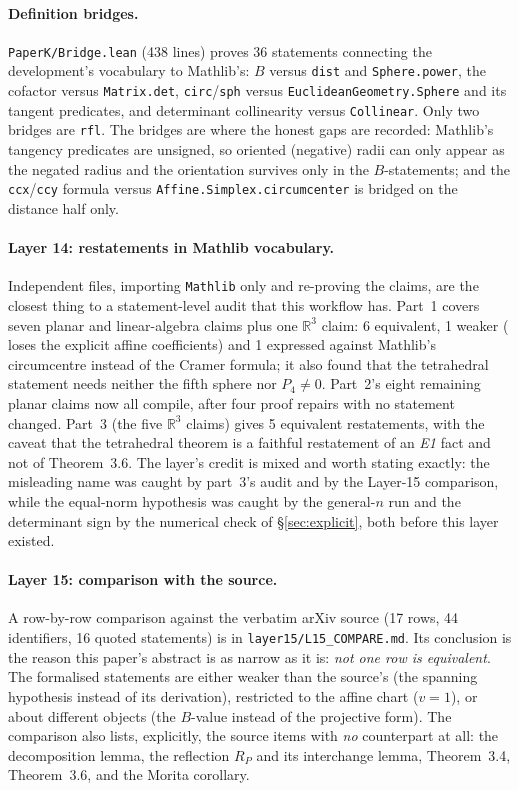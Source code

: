 \documentclass[11pt]{article}
\theoremstyle{definition}
\theoremstyle{remark}
\newcommand{\RR}{\mathbb{R}}
\begin{document}
\paragraph{Definition bridges.} \texttt{PaperK/Bridge.lean} (438 lines) proves 36 statements
connecting the development's vocabulary to Mathlib's: $B$ versus \texttt{dist} and
\texttt{Sphere.power}, the cofactor versus \texttt{Matrix.det}, \texttt{circ}/\texttt{sph} versus
\texttt{EuclideanGeometry.Sphere} and its tangent predicates, and determinant collinearity versus
\texttt{Collinear}. Only two bridges are \texttt{rfl}. The bridges are where the honest gaps are
recorded: Mathlib's tangency predicates are unsigned, so oriented (negative) radii can only appear as
the negated radius and the orientation survives only in the $B$-statements; and the
\texttt{ccx}/\texttt{ccy} formula versus \texttt{Affine.Simplex.circumcenter} is bridged on the
distance half only.

\paragraph{Layer 14: restatements in Mathlib vocabulary.} Independent files, importing
\texttt{Mathlib} only and re-proving the claims, are the closest thing to a statement-level audit
that this workflow has. Part~1 covers seven planar and linear-algebra claims plus one $\RR^3$ claim: 6 equivalent, 1 weaker
( loses the explicit affine coefficients) and 1 expressed against Mathlib's
circumcentre instead of the Cramer formula; it also found that the tetrahedral statement needs
neither the fifth sphere nor $P_4\neq0$. Part~2's eight remaining planar claims now all compile,
after four proof repairs with no statement changed. Part~3 (the five $\RR^3$ claims) gives 5
equivalent restatements, with the caveat that the tetrahedral theorem is a faithful restatement of
an \emph{E1} fact and not of Theorem~3.6. The layer's credit is mixed and worth stating exactly: the
misleading name was caught by part~3's audit and by the Layer-15 comparison, while the equal-norm
hypothesis was caught by the general-$n$ run and the determinant sign by the numerical check of
\S\ref{sec:explicit}, both before this layer existed.

\paragraph{Layer 15: comparison with the source.} A row-by-row comparison against the verbatim
arXiv source (17 rows, 44 identifiers, 16 quoted statements) is in
\texttt{layer15/L15\_COMPARE.md}. Its conclusion is the reason this paper's abstract is
as narrow as it is: \emph{not one row is equivalent}. The formalised statements are either weaker
than the source's (the spanning hypothesis instead of its derivation), restricted to the affine chart
($v=1$), or about different objects (the $B$-value instead of the projective form). The comparison
also lists, explicitly, the source items with \emph{no} counterpart at all: the decomposition lemma,
the reflection $R_P$ and its interchange lemma, Theorem~3.4, Theorem~3.6, and the Morita corollary.
\end{document}
